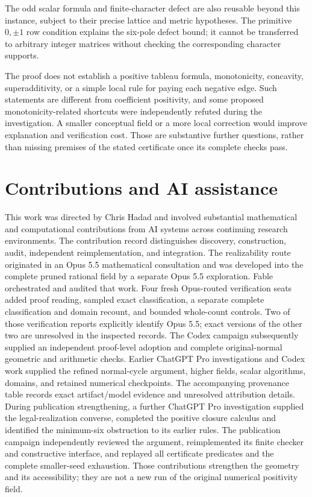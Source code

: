 \documentclass[11pt]{article}
\theoremstyle{definition}\newtheorem{definition}[theorem]{Definition}
\theoremstyle{remark}\newtheorem{remark}[theorem]{Remark}
\begin{document}
The odd scalar formula and finite-character defect are also reusable beyond
this instance, subject to their precise lattice and metric hypotheses.
The primitive \(0,\pm1\) row condition explains the six-pole defect bound;
it cannot be transferred to arbitrary integer matrices without checking
the corresponding character supports.

The proof does not establish a positive tableau formula, monotonicity,
concavity, superadditivity, or a simple local rule for paying each negative
edge. Such statements are different from coefficient positivity, and some
proposed monotonicity-related shortcuts were independently refuted during
the investigation. A smaller conceptual field or a more local correction
would improve explanation and verification cost. Those are substantive
further questions, rather than missing premises of the stated certificate
once its complete checks pass.

\section{Contributions and AI assistance}
This work was directed by Chris Hadad and involved substantial mathematical
and computational contributions from AI systems across continuing research
environments. The contribution record distinguishes discovery, construction,
audit, independent reimplementation, and integration.
The realizability route originated in an Opus 5.5 mathematical consultation
and was developed into the complete pruned rational field by a separate
Opus 5.5 exploration. Fable orchestrated and audited that work. Four fresh
Opus-routed verification seats added proof reading, sampled exact classification,
a separate complete
classification and domain recount, and bounded whole-count controls. Two
of those verification reports explicitly identify Opus 5.5; exact versions
of the other two are unresolved in the inspected records. The Codex
campaign subsequently supplied an independent proof-level adoption and
complete original-normal geometric and arithmetic checks. Earlier ChatGPT
Pro investigations and Codex work supplied the refined normal-cycle
argument, higher fields, scalar algorithms, domains, and retained numerical
checkpoints. The accompanying provenance table records exact artifact/model
evidence and unresolved attribution details.
During publication strengthening, a further ChatGPT Pro investigation
supplied the legal-realization converse, completed the positive closure
calculus and identified the minimum-six obstruction to its earlier rules.
The publication campaign independently reviewed the argument, reimplemented
its finite checker and constructive interface, and replayed all certificate
predicates and the complete smaller-seed exhaustion. Those contributions
strengthen the geometry and its accessibility; they are not a new run of
the original numerical positivity field.
\end{document}
